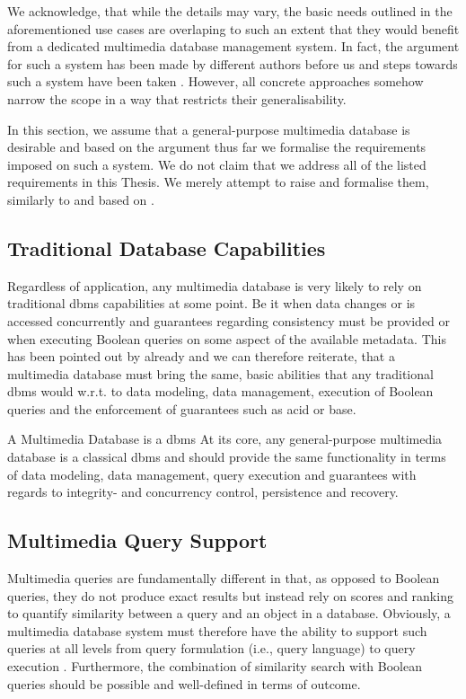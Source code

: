 We acknowledge, that while the details may vary, the basic needs outlined in the aforementioned use cases are overlaping to such an extent that they would benefit from a dedicated multimedia database management system. In fact, the argument for such a system has been made by different authors before us \cite{Adjeroh:1997Multimedia,Smeulders:2000Content,Zahalka:2014towards,Jonson:2016,Khaleel:2021An} and steps towards such a system have been taken \cite{Giangreco:2018Database,Wang:2021Milvus}. However, all concrete approaches somehow narrow the scope in a way that restricts their generalisability.

In this section, we assume that a general-purpose multimedia database is desirable and based on the argument thus far we formalise the requirements imposed on such a system. We do not claim that we address all of the listed requirements in this Thesis. We merely attempt to raise and formalise them, similarly to and based on \cite{Adjeroh:1997Multimedia,Jonson:2016,Khaleel:2021An}.

\subsection{Traditional Database Capabilities}
Regardless of application, any multimedia database is very likely to rely on traditional \acrshort{dbms} capabilities at some point. Be it when data changes or is accessed concurrently and guarantees regarding consistency must be provided or when executing Boolean queries on some aspect of the available metadata. This has been pointed out by \cite{Adjeroh:1997Multimedia,Khaleel:2021An} already and we can therefore reiterate, that a multimedia database must bring the same, basic abilities that any traditional \acrshort{dbms} would w.r.t. to data modeling, data management, execution of Boolean queries and the enforcement of guarantees such as \acrshort{acid} or \acrshort{base}.

\begin{requirement}[label=requirement:classical_dbms]{A Multimedia Database is a \acrshort{dbms}}{}
    At its core, any general-purpose multimedia database is a classical \acrlong{dbms} and should provide the same functionality in terms of data modeling, data management, query execution and guarantees with regards to integrity- and concurrency control, persistence and recovery.
\end{requirement}

\subsection{Multimedia Query Support}
Multimedia queries are fundamentally different in that, as opposed to Boolean queries, they do not produce exact results but instead rely on scores and ranking to quantify similarity between a query and an object in a database. Obviously, a multimedia database system must therefore have the ability to support such queries at all levels from query formulation (i.e., query language) to query execution \cite{Adjeroh:1997Multimedia}. Furthermore, the combination of similarity search with Boolean queries should be possible and well-defined in terms of outcome.

